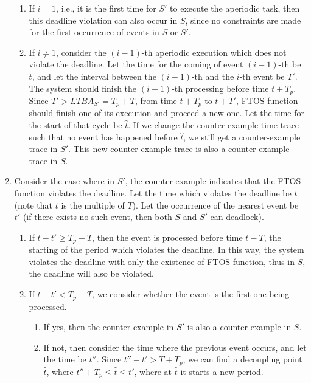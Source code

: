 \documentclass[10pt, a4paper, onecolumn, conference, compsocconf]{IEEEtran}
\begin{document}
\begin{IEEEproof}
\begin{enumerate}
\begin{figure}
\end{figure}
        \begin{enumerate}
            \item If $i=1$, i.e., it is the first time for $S'$ to execute the aperiodic task, then this deadline violation can also occur in $S$, since no constraints are made for the first
                occurrence of events in $S$ or $S'$.
            \item If $i \neq 1$, consider the $(i-1)$-th aperiodic execution which does not violate the deadline. Let the time for the coming of event $(i-1)$-th be $t$, and let the interval between the $(i-1)$-th
                  and the $i$-th event be $T'$.  The system should finish the $(i-1)$-th processing before time $t+T_p$. Since $T'>LTBA_{S'}=T_p + T$, from time $t+T_p$ to $t+T'$, FTOS function should finish one of its execution and proceed a new one. Let the time for the start of that cycle be $\hat{t}$. If we change the counter-example time trace such that no event has happened before $\hat{t}$, we still get a counter-example trace in $S'$. This new counter-example trace is also a counter-example trace in $S$.
        \end{enumerate}
    \item Consider the case where in $S'$, the counter-example indicates that the FTOS function violates the deadline. Let the time which violates the deadline be $t$ (note that $t$ is the multiple of $T$). Let the occurrence of the nearest event be $t'$ (if there exists no such event, then both $S$ and $S'$ can deadlock).
          \begin{enumerate}
            \item  If $t - t' \geq T_p + T$, then the event is processed before time $t-T$, the starting of the period which violates the deadline. In this way, the system violates the deadline with only the existence of FTOS function, thus in $S$, the deadline will also be violated.
            \item  If $t - t' < T_p + T$, we consider whether the event is the first one being processed.
            \begin{enumerate}
            \item If yes, then the counter-example in $S'$ is also a counter-example in $S$.
            \item If not, then consider the time where the previous event occurs, and let the time be $t''$. Since $t''-t'> T+ T_p$, we can find a decoupling point $\hat{t}$, where $t'' + T_p\leq \hat{t} \leq t'$, where at $\hat{t}$ it starts a new period.

\end{enumerate}
\end{enumerate}
\end{enumerate}
\end{IEEEproof}
\end{document}
